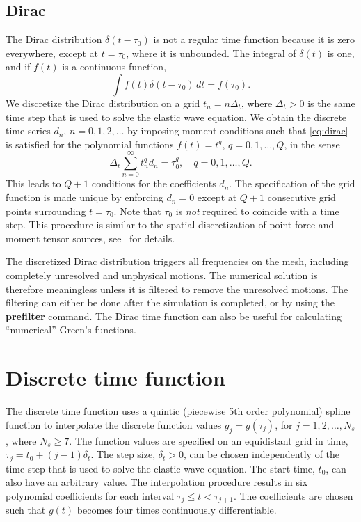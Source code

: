 \documentclass[11pt]{report}
\begin{document}
{\subsection{Dirac}
The Dirac distribution $\delta(t-\tau_0)$ is not a regular time function because it is zero everywhere,
except at $t=\tau_0$, where it is unbounded. The integral of $\delta(t)$ is one, and if $f(t)$ is a
continuous function,
\begin{equation}\label{eq:dirac}
	\int f(t)\delta(t-\tau_0)\, dt = f(\tau_0).
\end{equation}
We discretize the Dirac distribution on a grid $t_n = n\Delta_t$, where $\Delta_t>0$ is the same
time step that is used to solve the elastic wave equation. We obtain the discrete time series $d_n$,
$n=0,1,2,\ldots$ by imposing moment conditions such that \eqref{eq:dirac} is satisfied for the
polynomial functions $f(t)=t^q$, $q=0,1,\ldots,Q$, in the sense
\[
	\Delta_t \sum_{n=0}^\infty t_n^q d_n = \tau_0^q,\quad q=0,1,\ldots,Q.
\]
This leads to $Q+1$ conditions for the coefficients $d_n$. The specification of the grid function is
made unique by enforcing $d_n=0$ except at $Q+1$ consecutive grid points surrounding $t=\tau_0$. Note
that $\tau_0$ is {\em not} required to coincide with a time step. This procedure is similar to the
spatial discretization of point force and moment tensor sources, see~\cite{PetSjo-10} for details.

The discretized Dirac distribution triggers all frequencies on the mesh, including completely
unresolved and unphysical motions. The numerical solution is therefore meaningless unless it is
filtered to remove the unresolved motions. The filtering can either be done after the simulation is
completed, or by using the {\bf prefilter} command. The Dirac time function can also be useful for
calculating ``numerical'' Green's functions.

\section{Discrete time function}

The discrete time function uses a quintic (piecewise 5th order polynomial) spline function to
interpolate the discrete function values $g_j = g(\tau_j)$, for $j=1,2,\ldots, N_s$, where $N_s\geq
	7$. The function values are specified on an equidistant grid in time, $\tau_j = t_0 + (j-1)
	\delta_t$. The step size, $\delta_t>0$, can be chosen independently of the time step that is used to
solve the elastic wave equation. The start time, $t_0$, can also have an arbitrary value. The
interpolation procedure results in six polynomial coefficients for each interval $\tau_j\leq t
	<\tau_{j+1}$. The coefficients are chosen such that $g(t)$ becomes four times continuously
differentiable.

}
\end{document}
